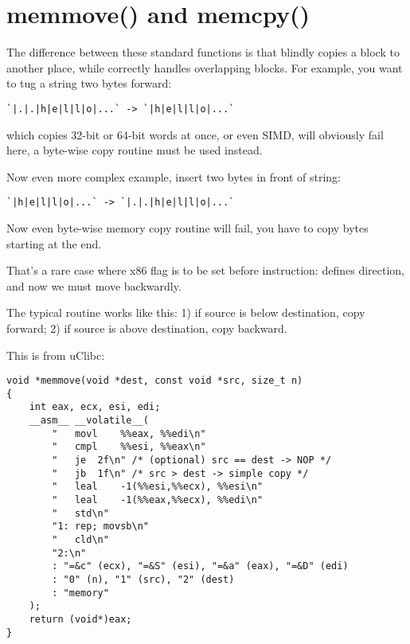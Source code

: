 \section{memmove() and memcpy()}
\label{memmove_and_DF}

The difference between these standard functions is that  blindly copies a block to another place,
while  correctly handles overlapping blocks.
For example, you want to tug a string two bytes forward:

\begin{lstlisting}
`|.|.|h|e|l|l|o|...` -> `|h|e|l|l|o|...`
\end{lstlisting}

 which copies 32-bit or 64-bit words at once, or even \ac{SIMD},
will obviously fail here, a byte-wise copy routine must be used instead.

Now even more complex example, insert two bytes in front of string:

\begin{lstlisting}
`|h|e|l|l|o|...` -> `|.|.|h|e|l|l|o|...`
\end{lstlisting}

Now even byte-wise memory copy routine will fail, you have to copy bytes starting at the end.

That's a rare case where  x86 flag is to be set before  instruction:
 defines direction, and now we must move backwardly.

The typical  routine works like this:
1) if source is below destination, copy forward;
2) if source is above destination, copy backward.

This is  from uClibc:

\begin{lstlisting}[style=customc]
void *memmove(void *dest, const void *src, size_t n)
{
	int eax, ecx, esi, edi;
	__asm__ __volatile__(
		"	movl	%%eax, %%edi\n"
		"	cmpl	%%esi, %%eax\n"
		"	je	2f\n" /* (optional) src == dest -> NOP */
		"	jb	1f\n" /* src > dest -> simple copy */
		"	leal	-1(%%esi,%%ecx), %%esi\n"
		"	leal	-1(%%eax,%%ecx), %%edi\n"
		"	std\n"
		"1:	rep; movsb\n"
		"	cld\n"
		"2:\n"
		: "=&c" (ecx), "=&S" (esi), "=&a" (eax), "=&D" (edi)
		: "0" (n), "1" (src), "2" (dest)
		: "memory"
	);
	return (void*)eax;
}
\end{lstlisting}

